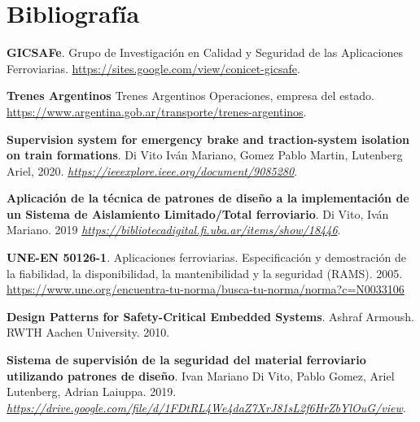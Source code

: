 
\section{Bibliografía}



 \begin{thebibliography}{30}

 \textbf{GICSAFe}. Grupo de Investigación en Calidad y Seguridad de las Aplicaciones Ferroviarias. \href{https://sites.google.com/view/conicet-gicsafe}{https://sites.google.com/view/conicet-gicsafe}.

 
 \textbf{Trenes Argentinos} Trenes Argentinos Operaciones, empresa del estado. \href{https://www.argentina.gob.ar/transporte/trenes-argentinos}{https://www.argentina.gob.ar/transporte/trenes-argentinos}.

 \textbf{Supervision system for emergency brake and traction-system isolation on train formations}. Di Vito Iván Mariano, Gomez Pablo Martin, Lutenberg Ariel, 2020. \href{https://ieeexplore.ieee.org/document/9085280}{\textit{https://ieeexplore.ieee.org/document/9085280}}.


 \textbf{Aplicación de la técnica de patrones de diseño a la implementación de un Sistema de Aislamiento Limitado/Total ferroviario}. Di Vito, Iván Mariano. 2019 \href{https://bibliotecadigital.fi.uba.ar/items/show/18446}{\textit{https://bibliotecadigital.fi.uba.ar/items/show/18446}}.

 


\textbf{UNE-EN 50126-1}. Aplicaciones ferroviarias. Especificación y demostración de la fiabilidad, la disponibilidad, la mantenibilidad y la seguridad (RAMS). 2005. \href{https://www.une.org/encuentra-tu-norma/busca-tu-norma/norma?c=N0033106}{https://www.une.org/encuentra-tu-norma/busca-tu-norma/norma?c=N0033106}


 \textbf{Design Patterns for Safety-Critical Embedded Systems}. Ashraf Armoush. RWTH Aachen University. 2010.



 \textbf{Sistema de supervisión de la seguridad del material ferroviario utilizando patrones de diseño}. Ivan Mariano Di Vito, Pablo Gomez, Ariel Lutenberg, Adrian Laiuppa. 2019. \href{https://drive.google.com/file/d/1FDtRL4We4daZ7XrJ81sL2f6HrZbYlOuG/view}{\textit{https://drive.google.com/file/d/1FDtRL4We4daZ7XrJ81sL2f6HrZbYlOuG/view}}. 


\end{thebibliography}

